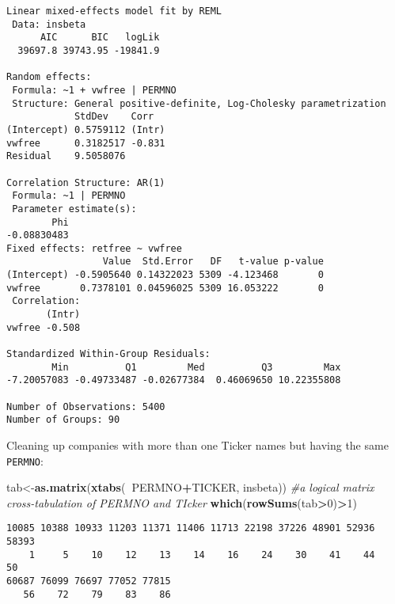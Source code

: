 \documentclass[]{book}
\newenvironment{Shaded}{\begin{snugshade}}{\end{snugshade}}
\newcommand{\CommentTok}[1]{\textcolor[rgb]{0.56,0.35,0.01}{\textit{#1}}}
\newcommand{\DecValTok}[1]{\textcolor[rgb]{0.00,0.00,0.81}{#1}}
\newcommand{\KeywordTok}[1]{\textcolor[rgb]{0.13,0.29,0.53}{\textbf{#1}}}
\newcommand{\NormalTok}[1]{#1}
\newcommand{\OperatorTok}[1]{\textcolor[rgb]{0.81,0.36,0.00}{\textbf{#1}}}
\begin{document}
\begin{verbatim}
Linear mixed-effects model fit by REML
 Data: insbeta 
      AIC      BIC   logLik
  39697.8 39743.95 -19841.9

Random effects:
 Formula: ~1 + vwfree | PERMNO
 Structure: General positive-definite, Log-Cholesky parametrization
            StdDev    Corr  
(Intercept) 0.5759112 (Intr)
vwfree      0.3182517 -0.831
Residual    9.5058076       

Correlation Structure: AR(1)
 Formula: ~1 | PERMNO 
 Parameter estimate(s):
        Phi 
-0.08830483 
Fixed effects: retfree ~ vwfree 
                 Value  Std.Error   DF   t-value p-value
(Intercept) -0.5905640 0.14322023 5309 -4.123468       0
vwfree       0.7378101 0.04596025 5309 16.053222       0
 Correlation: 
       (Intr)
vwfree -0.508

Standardized Within-Group Residuals:
        Min          Q1         Med          Q3         Max 
-7.20057083 -0.49733487 -0.02677384  0.46069650 10.22355808 

Number of Observations: 5400
Number of Groups: 90 
\end{verbatim}

Cleaning up companies with more than one Ticker names but having the same \texttt{PERMNO}:

\begin{Shaded}
\begin{Highlighting}[]
\NormalTok{tab<-}\KeywordTok{as.matrix}\NormalTok{(}\KeywordTok{xtabs}\NormalTok{(}\OperatorTok{~}\NormalTok{PERMNO}\OperatorTok{+}\NormalTok{TICKER, insbeta)) }\CommentTok{#a logical matrix cross-tabulation of PERMNO and TIcker}
\KeywordTok{which}\NormalTok{(}\KeywordTok{rowSums}\NormalTok{(tab}\OperatorTok{>}\DecValTok{0}\NormalTok{)}\OperatorTok{>}\DecValTok{1}\NormalTok{)}
\end{Highlighting}
\end{Shaded}

\begin{verbatim}
10085 10388 10933 11203 11371 11406 11713 22198 37226 48901 52936 58393 
    1     5    10    12    13    14    16    24    30    41    44    50 
60687 76099 76697 77052 77815 
   56    72    79    83    86 
\end{verbatim}

\begin{Shaded}
\end{Shaded}
\end{document}

